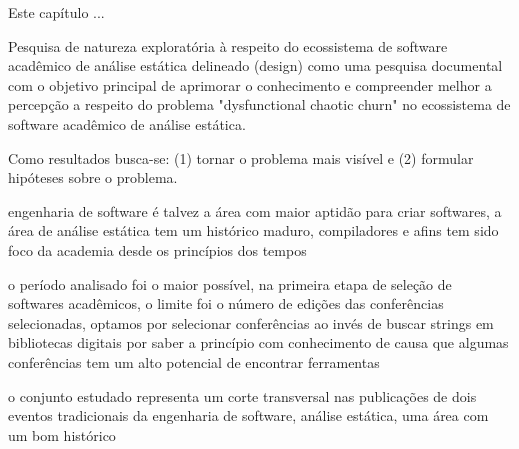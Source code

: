 {Este capítulo ... }
\label{metodologia}

Pesquisa de natureza exploratória à respeito do ecossistema de software
acadêmico de análise estática delineado (design) como uma pesquisa documental
com o objetivo principal de aprimorar o conhecimento e compreender melhor a
percepção a respeito do problema "dysfunctional chaotic churn" no ecossistema
de software acadêmico de análise estática.

Como resultados busca-se: (1) tornar o problema mais visível e (2) formular
hipóteses sobre o problema.

% 
% 
% 
% 
% 
% 
% 
% 

engenharia de software é talvez a área com maior aptidão
para criar softwares, a área de análise estática tem um
histórico maduro, compiladores e afins tem sido foco da
academia desde os princípios dos tempos

o período analisado foi o maior possível, na primeira etapa
de seleção de softwares acadêmicos, o limite foi o número de
edições das conferências selecionadas, optamos por selecionar
conferências ao invés de buscar strings em bibliotecas digitais
por saber a princípio com conhecimento de causa que algumas
conferências tem um alto potencial de encontrar ferramentas

o conjunto estudado representa um corte transversal nas
publicações de dois eventos tradicionais da engenharia
de software, análise estática, uma área com um bom histórico

